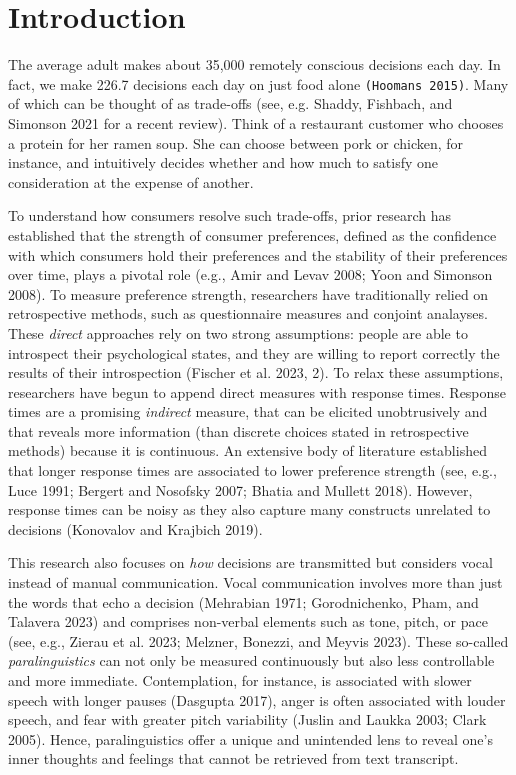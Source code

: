 \documentclass[
  a4paper,
]{scrreprt}
\begin{document}
\hypertarget{introduction-2}{%
\section{Introduction}\label{introduction-2}}

The average adult makes about 35,000 remotely conscious decisions each
day. In fact, we make 226.7 decisions each day on just food alone
\texttt{(Hoomans\ 2015)}. Many of which can be thought of as trade-offs
(see, e.g. Shaddy, Fishbach, and Simonson 2021 for a recent review).
Think of a restaurant customer who chooses a protein for her ramen soup.
She can choose between pork or chicken, for instance, and intuitively
decides whether and how much to satisfy one consideration at the expense
of another.

To understand how consumers resolve such trade-offs, prior research has
established that the strength of consumer preferences, defined as the
confidence with which consumers hold their preferences and the stability
of their preferences over time, plays a pivotal role (e.g., Amir and
Levav 2008; Yoon and Simonson 2008). To measure preference strength,
researchers have traditionally relied on retrospective methods, such as
questionnaire measures and conjoint analayses. These \emph{direct}
approaches rely on two strong assumptions: people are able to introspect
their psychological states, and they are willing to report correctly the
results of their introspection (Fischer et al. 2023, 2). To relax these
assumptions, researchers have begun to append direct measures with
response times. Response times are a promising \emph{indirect} measure,
that can be elicited unobtrusively and that reveals more information
(than discrete choices stated in retrospective methods) because it is
continuous. An extensive body of literature established that longer
response times are associated to lower preference strength (see, e.g.,
Luce 1991; Bergert and Nosofsky 2007; Bhatia and Mullett 2018). However,
response times can be noisy as they also capture many constructs
unrelated to decisions (Konovalov and Krajbich 2019).

This research also focuses on \emph{how} decisions are transmitted but
considers vocal instead of manual communication. Vocal communication
involves more than just the words that echo a decision (Mehrabian 1971;
Gorodnichenko, Pham, and Talavera 2023) and comprises non-verbal
elements such as tone, pitch, or pace (see, e.g., Zierau et al. 2023;
Melzner, Bonezzi, and Meyvis 2023). These so-called
\emph{paralinguistics} can not only be measured continuously but also
less controllable and more immediate. Contemplation, for instance, is
associated with slower speech with longer pauses (Dasgupta 2017), anger
is often associated with louder speech, and fear with greater pitch
variability (Juslin and Laukka 2003; Clark 2005). Hence, paralinguistics
offer a unique and unintended lens to reveal one's inner thoughts and
feelings that cannot be retrieved from text transcript.
\end{document}
